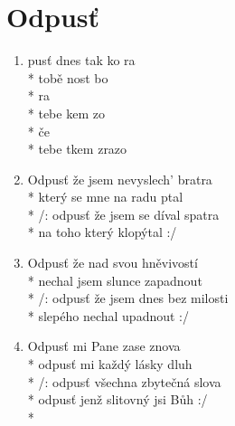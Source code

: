 \section{Odpusť}
\begin{enumerate}
\item {}pusť dnes tak ko ra \\*
 tobě nost bo \\*
 ra \\*
 tebe kem zo  \\* 
 če \\*
 tebe tkem zrazo
\item Odpusť že jsem nevyslech' bratra \\*
který se mne na radu ptal \\*
/: odpusť že jsem se díval spatra \\*
na toho který klopýtal :/ 
\item Odpusť že nad svou hněvivostí \\*
nechal jsem slunce zapadnout \\*
/: odpusť že jsem dnes bez milosti \\*
slepého nechal upadnout :/ 
\item Odpusť mi Pane zase znova \\*
odpusť mi každý lásky dluh \\*
/: odpusť všechna zbytečná slova \\*
odpusť jenž slitovný jsi Bůh :/ \\*
\end{enumerate}
